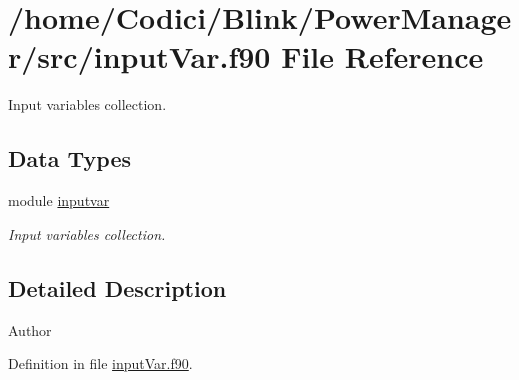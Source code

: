 \hypertarget{input_var_8f90}{\section{/home/\-Codici/\-Blink/\-Power\-Manager/src/input\-Var.f90 File Reference}
\label{input_var_8f90}
}


Input variables collection.  


\subsection*{Data Types}
\begin{DoxyCompactItemize}
\item 
module \hyperlink{classinputvar}{inputvar}
\begin{DoxyCompactList}\small\item\em Input variables collection. \end{DoxyCompactList}\end{DoxyCompactItemize}


\subsection{Detailed Description}
\begin{DoxyAuthor}{Author}

\end{DoxyAuthor}


Definition in file \hyperlink{input_var_8f90_source}{input\-Var.\-f90}.

